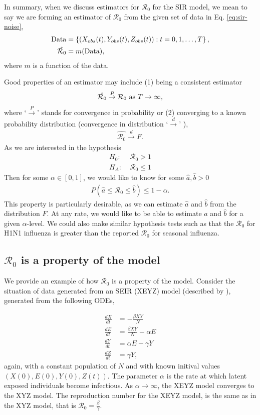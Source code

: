 \documentclass[12pt]{article}
\newcommand{\rr}{\ensuremath{\mathcal{R}_0}}
\begin{document}
In summary, when we discuss estimators for $\rr$ for the SIR model, we mean to say we are forming an estimator of $\rr$ from the given set of data in Eq. \ref{eq:sir-noise},
\begin{align*}
  \textnormal{Data} &= \left \{\left (X_{obs}(t), Y_{obs}(t), Z_{obs}(t) \right ) : t=0, 1, \dots, T\right \}, \\
  \hat{\rr} &= m(\textnormal{Data}),
\end{align*}
where $m$ is a function of the data.

Good properties of an estimator may include (1) being a consistent estimator
\begin{align*}
  \hat{\rr} \overset{P}{\to} \rr \textnormal{ as } T\to \infty,
\end{align*}
where `$\overset{P}{\to}$' stands for convergence in probability \citep{wasserman2004} or (2) converging to a known probability distribution (convergence in distribution `$\overset{d}{\to}$' \citep{wasserman2004}),
\begin{align*}
\hat{\rr} \overset{d}{\to} F.  
\end{align*}
As we are interested in the hypothesis
\begin{align*}
  H_0:\;& \rr > 1 \\
  H_A:\;& \rr \le 1
\end{align*}
Then for some $\alpha \in [0,1]$, we would like to know for some $\hat{a}, \hat{b} >0$
\begin{align*}
P(\hat{a} \le \rr \le \hat{b}) \le 1 - \alpha.
\end{align*}
This property is particularly desirable, as we can estimate $\hat{a}$ and $\hat{b}$ from the distribution $F$.  At any rate, we would like to be able to estimate $\hat{a}$ and $\hat{b}$ for a given $\alpha$-level.  We could also make similar hypothesis tests such as that the $\rr$ for H1N1 influenza is greater than the reported $\rr$ for seasonal influenza.

\subsection{$\rr$ is a property of the model}\label{sec:prop}

We provide an example of how $\rr$ is a property of the model.  Consider the situation of data generated from an SEIR (XEYZ) model (described by \cite{cintronarias2009}), generated from the following ODEs,

\begin{align*}
  \frac{dX}{dt} &= - \frac{\beta XY}{N} \\
  \frac{dE}{dt} &= \frac{\beta XY}{N}  - \alpha E\\
  \frac{dY}{dt} &= \alpha E - \gamma Y \\
  \frac{dZ}{dt} &= \gamma Y,
\end{align*}
again, with a constant population of $N$ and with known initival values $(X(0), E(0), Y(0), Z(t))$.  The parameter $\alpha$ is the rate at which latent exposed individuals become infectious.  As $\alpha \to \infty$, the XEYZ model converges to the XYZ model.  The reproduction number for the XEYZ model, is the same as in the XYZ model, that is $\rr = \frac{\beta}{\gamma}$.
\end{document}
